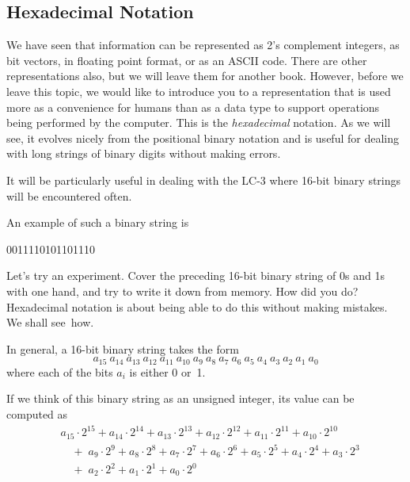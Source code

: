 \documentclass{patt}
\begin{document}

\subsection{Hexadecimal Notation}

We have seen that information can be represented as
2's complement integers, as bit vectors, in
floating point format, or as an ASCII code.  There are other
representations also, but we will leave them for another book.
However, before we leave this topic, we would like to introduce
you to a representation that is used more as a convenience for
humans than as a data type to support operations being performed
by the computer.  This is the {\em hexadecimal} notation.  As
we will see, it evolves nicely from the positional binary notation
and is useful for dealing with long strings of binary digits
without making errors.

It will be particularly useful in dealing with the LC-3 where
16-bit binary strings will be encountered often.

An example of such a binary string is

\begin{cctable}
0011110101101110
\end{cctable}

\noindent
{}
Let's try an experiment. Cover the preceding 16-bit binary string
of 0s and 1s with one hand, and try to write it down from
memory. How did you do?  Hexadecimal notation is about being
able to do this without making mistakes.  We shall see~how.

In general, a 16-bit binary string takes the form
\begin{equation*}
a_{15}\ a_{14}\ a_{13}\ a_{12}\ a_{11}\ a_{10}\
  a_9\ a_8\ a_7\ a_6\ a_5\ a_4\ a_3\ a_2\ a_1\ a_0
\end{equation*}
where each of the bits $a_i$ is either 0 or~1.

If we think of this binary string as an unsigned integer, its
value can be computed as
\begin{align*}
&a_{15}\cdot 2^{15}+a_{14}\cdot 2^{14}+a_{13}\cdot 2^{13}+
  a_{12}\cdot 2^{12}+a_{11}\cdot 2^{11}+a_{10}\cdot 2^{10}\\
&\quad +\; a_9\cdot 2^9+a_8\cdot 2^8+a_7\cdot 2^7+a_6\cdot 2^6+a_5\cdot 2^5+a_4\cdot 2^4+a_3\cdot 2^3\\
&\quad +\; a_2\cdot 2^2+a_1\cdot 2^1+a_0\cdot 2^0
\end{align*}
\end{document}
